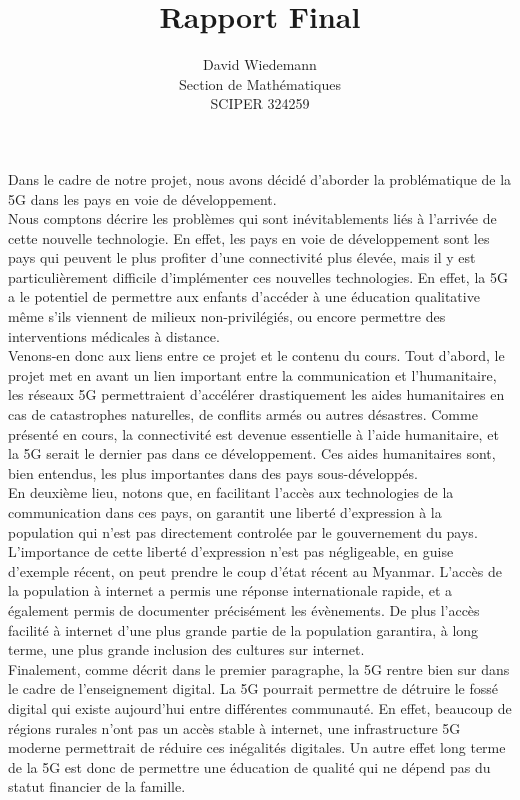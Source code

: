 \documentclass[11pt, a4paper]{article}
\begin{document}
\title{Rapport Final}
\author{David Wiedemann\\
Section de Mathématiques\\
SCIPER 324259}
\maketitle
Dans le cadre de notre projet, nous avons décidé d'aborder la problématique de la 5G dans les pays en voie de développement.\\
Nous comptons décrire les problèmes qui sont inévitablements liés à l'arrivée de cette nouvelle technologie.
En effet, les pays en voie de développement sont les pays qui peuvent le plus profiter d'une connectivité plus élevée, mais il y est particulièrement difficile d'implémenter ces nouvelles technologies.
En effet, la 5G a le potentiel de permettre aux enfants d'accéder à une éducation qualitative même s'ils viennent de milieux non-privilégiés, ou encore permettre des interventions médicales à distance.\\

Venons-en donc aux liens entre ce projet et le contenu du cours.
Tout d'abord,  le projet met en avant un lien important entre la communication et l'humanitaire, les réseaux 5G permettraient d'accélérer drastiquement les aides humanitaires en cas de catastrophes naturelles, de conflits armés ou autres désastres. Comme présenté en cours, la connectivité est devenue essentielle à l'aide humanitaire, et la 5G serait le dernier pas dans ce développement. Ces aides humanitaires sont, bien entendus, les plus importantes dans des pays sous-développés.\\

En deuxième lieu, notons que, en facilitant l'accès aux technologies de la communication dans ces pays, on garantit une liberté d'expression à la population qui n'est pas directement controlée par le gouvernement du pays.
L'importance de cette liberté d'expression n'est pas négligeable, en guise d'exemple récent, on peut prendre le coup d'état récent au Myanmar.
L'accès  de la population à internet a permis une réponse internationale rapide, et a également permis de documenter précisément les évènements.
De plus l'accès facilité à internet d'une plus grande partie de la population garantira, à long terme, une plus grande inclusion des cultures sur internet.\\

Finalement, comme décrit dans le premier paragraphe, la 5G rentre bien sur dans le cadre de l'enseignement digital.
La 5G pourrait permettre de détruire le fossé digital qui existe aujourd'hui entre différentes communauté. 
En effet, beaucoup de régions rurales n'ont pas un accès stable à internet, une infrastructure 5G moderne permettrait de réduire ces inégalités digitales.
Un autre effet long terme de la 5G est donc de permettre une éducation de qualité qui ne dépend pas du statut financier de la famille.
\end{document}
